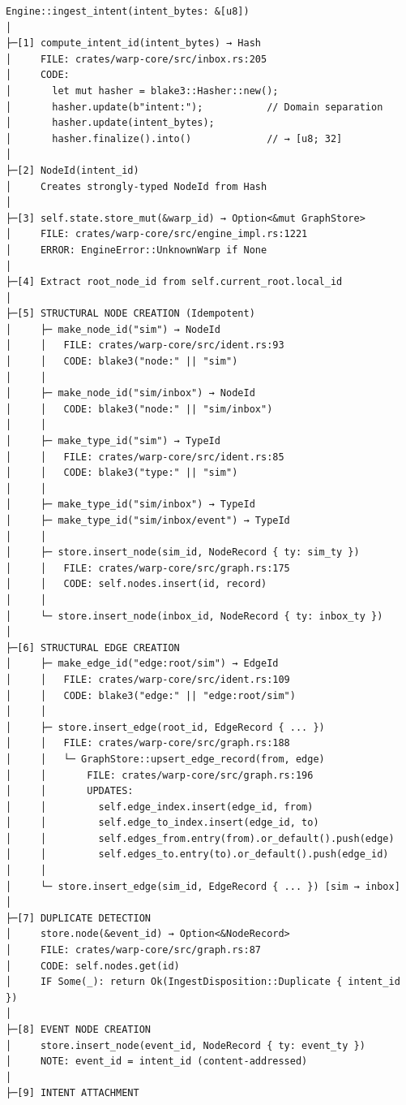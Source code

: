 \documentclass[
]{book}
\begin{document}
\begin{verbatim}
Engine::ingest_intent(intent_bytes: &[u8])
│
├─[1] compute_intent_id(intent_bytes) → Hash
│     FILE: crates/warp-core/src/inbox.rs:205
│     CODE:
│       let mut hasher = blake3::Hasher::new();
│       hasher.update(b"intent:");           // Domain separation
│       hasher.update(intent_bytes);
│       hasher.finalize().into()             // → [u8; 32]
│
├─[2] NodeId(intent_id)
│     Creates strongly-typed NodeId from Hash
│
├─[3] self.state.store_mut(&warp_id) → Option<&mut GraphStore>
│     FILE: crates/warp-core/src/engine_impl.rs:1221
│     ERROR: EngineError::UnknownWarp if None
│
├─[4] Extract root_node_id from self.current_root.local_id
│
├─[5] STRUCTURAL NODE CREATION (Idempotent)
│     ├─ make_node_id("sim") → NodeId
│     │   FILE: crates/warp-core/src/ident.rs:93
│     │   CODE: blake3("node:" || "sim")
│     │
│     ├─ make_node_id("sim/inbox") → NodeId
│     │   CODE: blake3("node:" || "sim/inbox")
│     │
│     ├─ make_type_id("sim") → TypeId
│     │   FILE: crates/warp-core/src/ident.rs:85
│     │   CODE: blake3("type:" || "sim")
│     │
│     ├─ make_type_id("sim/inbox") → TypeId
│     ├─ make_type_id("sim/inbox/event") → TypeId
│     │
│     ├─ store.insert_node(sim_id, NodeRecord { ty: sim_ty })
│     │   FILE: crates/warp-core/src/graph.rs:175
│     │   CODE: self.nodes.insert(id, record)
│     │
│     └─ store.insert_node(inbox_id, NodeRecord { ty: inbox_ty })
│
├─[6] STRUCTURAL EDGE CREATION
│     ├─ make_edge_id("edge:root/sim") → EdgeId
│     │   FILE: crates/warp-core/src/ident.rs:109
│     │   CODE: blake3("edge:" || "edge:root/sim")
│     │
│     ├─ store.insert_edge(root_id, EdgeRecord { ... })
│     │   FILE: crates/warp-core/src/graph.rs:188
│     │   └─ GraphStore::upsert_edge_record(from, edge)
│     │       FILE: crates/warp-core/src/graph.rs:196
│     │       UPDATES:
│     │         self.edge_index.insert(edge_id, from)
│     │         self.edge_to_index.insert(edge_id, to)
│     │         self.edges_from.entry(from).or_default().push(edge)
│     │         self.edges_to.entry(to).or_default().push(edge_id)
│     │
│     └─ store.insert_edge(sim_id, EdgeRecord { ... }) [sim → inbox]
│
├─[7] DUPLICATE DETECTION
│     store.node(&event_id) → Option<&NodeRecord>
│     FILE: crates/warp-core/src/graph.rs:87
│     CODE: self.nodes.get(id)
│     IF Some(_): return Ok(IngestDisposition::Duplicate { intent_id })
│
├─[8] EVENT NODE CREATION
│     store.insert_node(event_id, NodeRecord { ty: event_ty })
│     NOTE: event_id = intent_id (content-addressed)
│
├─[9] INTENT ATTACHMENT

\end{verbatim}
\end{document}

